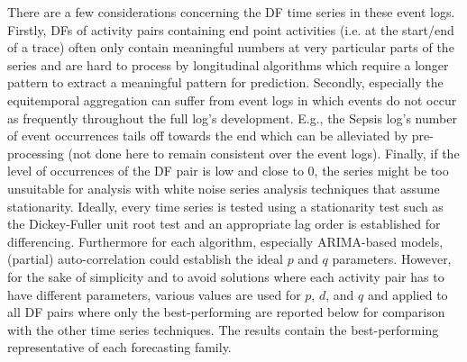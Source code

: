 There are a few considerations concerning the DF time series in these event logs.
Firstly, DFs of activity pairs containing end point activities (i.e. at the start/end of a trace) often only contain meaningful numbers at very particular parts of the series and are hard to process by longitudinal algorithms which require a longer pattern to extract a meaningful pattern for prediction.
Secondly, especially the equitemporal aggregation can suffer from event logs in which events do not occur as frequently throughout the full log's development.
E.g., the Sepsis log's number of event occurrences tails off towards the end which can be alleviated by pre-processing (not done here to remain consistent over the event logs).
Finally, if the level of occurrences of the DF pair is low and close to 0, the series might be too unsuitable for analysis with white noise series analysis techniques that assume stationarity.
Ideally, every time series is tested using a stationarity test such as the Dickey-Fuller unit root test \cite{leybourne1995testing} and an appropriate lag order is established for differencing. 
Furthermore for each algorithm, especially ARIMA-based models, (partial) auto-correlation could establish the ideal $p$ and $q$ parameters.
However, for the sake of simplicity and to avoid solutions where each activity pair has to have different parameters, various values are used for $p$, $d$, and $q$ and applied to all DF pairs where only the best-performing are reported below for comparison with the other time series techniques.
The results contain the best-performing representative of each forecasting family.

